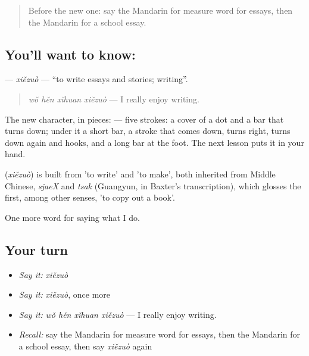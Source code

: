\label{lesson:ZH-C251-xiezuo}



\begin{quote}
Before the new one: say the Mandarin for measure word for essays, then the Mandarin for a school essay.
\end{quote}

\subsection*{You'll want to know: }
\textbf{} — \emph{xiězuò} — \textquotedblleft{}to write essays and stories; writing\textquotedblright{}.

\begin{quote}
\textbf{} \emph{wǒ hěn xǐhuan xiězuò} — I really enjoy writing.
\end{quote}

The new character, in pieces:  — five strokes: a cover of a dot and a bar that turns down; under it a short bar, a stroke that comes down, turns right, turns down again and hooks, and a long bar at the foot. The next lesson puts it in your hand.

\begin{cousinweb}
\textbf{} (\emph{xiězuò}) is built from  'to write' and  'to make', both inherited from Middle Chinese, \emph{sjaeX} and \emph{tsak} (Guangyun, in Baxter's transcription), which glosses the first, among other senses, 'to copy out a book'.
\end{cousinweb}

\begin{grammarlens}[title={What you've built}]
One more word for saying what I do.
\end{grammarlens}

\subsection*{Your turn}
\begin{itemize}
\raggedright
  \item \emph{Say it:} \emph{xiězuò}
  \item \emph{Say it:} \emph{xiězuò}, once more
  \item \emph{Say it:} \emph{wǒ hěn xǐhuan xiězuò} — I really enjoy writing.
  \item \emph{Recall:} say the Mandarin for measure word for essays, then the Mandarin for a school essay, then say \emph{xiězuò} again
\end{itemize}

